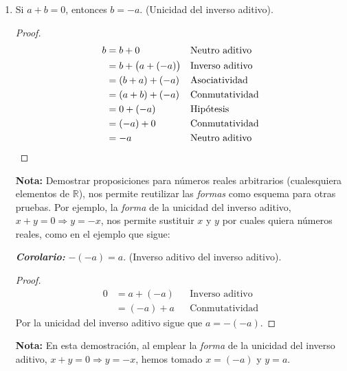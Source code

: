 \documentclass[11pt]{article}
\newcommand{\R}{\mathbb{R}}
\newcommand{\bfit}[1]{\textbf{\textit{#1}}}
\begin{document}
\begin{enumerate}[label=\alph*)]
 \item Si $a+b=0$, entonces $b=-a$. (Unicidad del inverso aditivo).
 \begin{proof}
 \begin{align*}
   b &= b + 0 && \text{Neutro aditivo}\\
   &= b + \bigl(a+(-a)\bigr) && \text{Inverso aditivo}\\
   &= (b+a) + (-a) && \text{Asociatividad}\\
   &= (a+b) + (-a) && \text{Conmutatividad}\\
   &= 0 + (-a) && \text{Hipótesis}\\
   &= (-a) + 0 && \text{Conmutatividad}\\
   &= -a && \text{Neutro aditivo} \qedhere
  \end{align*}
 \end{proof}
 \textbf{Nota:} Demostrar proposiciones para números reales arbitrarios (cualesquiera elementos de $\R$), nos permite reutilizar las \textit{formas} como esquema para otras pruebas. Por ejemplo, la \textit{forma} de la unicidad del inverso aditivo, $x+y=0 \Longrightarrow y=-x$, nos permite sustituir $x$ y $y$ por cuales quiera números reales, como en el ejemplo que sigue:
 
 \bfit{Corolario:} $-(-a)=a$. (Inverso aditivo del inverso aditivo).
 \begin{proof}
 \begin{align*}
  0 &= a + (-a) && \text{Inverso aditivo}\\
  &= (-a) + a && \text{Conmutatividad}
 \end{align*} Por la unicidad del inverso aditivo sigue que $a=-(-a)$.
 \end{proof}
 \textbf{Nota:} En esta demostración, al emplear la \textit{forma} de la unicidad del inverso aditivo, $x+y=0 \Longrightarrow y=-x$, hemos tomado $x=(-a)$ y $y=a$.


\end{enumerate}
\end{document}
